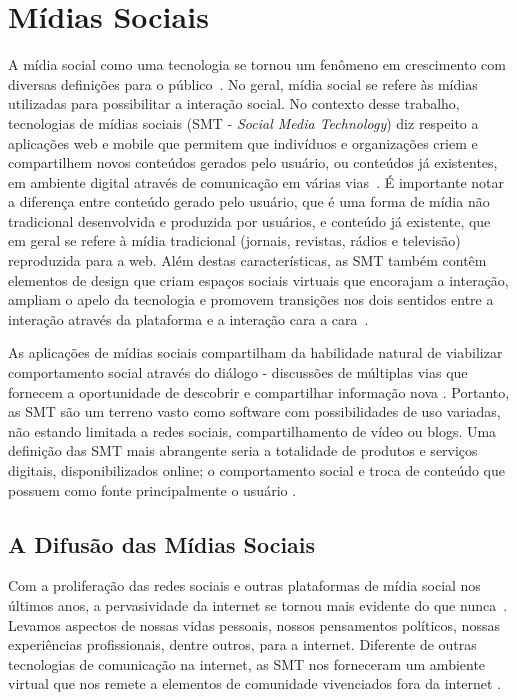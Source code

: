 \chapter{Mídias Sociais}
\label{cap:midias-sociais}

A mídia social como uma tecnologia se tornou um fenômeno em crescimento com
diversas definições para o público~\cite{davis2012}. No geral, mídia social
se refere às mídias utilizadas para possibilitar a interação social. No contexto
desse trabalho, tecnologias de mídias sociais (SMT - \textit{Social Media Technology})
diz respeito a aplicações web e mobile que permitem que indivíduos e organizações
criem e compartilhem novos conteúdos gerados pelo usuário, ou conteúdos já
existentes, em ambiente digital através de comunicação em várias vias~\cite{davis2012}. É
importante notar a diferença entre conteúdo gerado pelo usuário, que é uma forma
de mídia não tradicional desenvolvida e produzida por usuários, e conteúdo já
existente, que em geral se refere à mídia tradicional (jornais, revistas, rádios
e televisão) reproduzida para a web. Além destas características, as SMT também
contêm elementos de design que criam espaços sociais virtuais que encorajam a 
interação, ampliam o apelo da tecnologia e promovem transições nos dois sentidos
entre a interação através da plataforma e a interação cara a cara~\cite{davis2012}.

As aplicações de mídias sociais compartilham da habilidade natural de viabilizar
comportamento social através do diálogo - discussões de múltiplas vias que
fornecem a oportunidade de descobrir e compartilhar informação nova
\cite{solis2008}.
%
Portanto, as SMT são um terreno vasto como software com possibilidades de uso
variadas, não estando limitada a redes sociais, compartilhamento de vídeo ou
blogs. Uma definição das SMT mais abrangente seria a totalidade de produtos
e serviços digitais, disponibilizados online; o comportamento social e troca de
conteúdo que possuem como fonte principalmente o usuário \cite{davis2012}.

\section{A Difusão das Mídias Sociais}

Com a proliferação das redes sociais e outras plataformas de mídia social nos
últimos anos, a pervasividade da internet se tornou mais evidente do que nunca~\cite{davis2012}.
%
Levamos aspectos de nossas vidas pessoais, nossos pensamentos políticos, nossas
experiências profissionais, dentre outros, para a internet. Diferente de outras
tecnologias de comunicação na internet, as SMT nos forneceram um ambiente
virtual que nos remete a elementos de comunidade vivenciados fora da internet
\cite{davis2012}.

